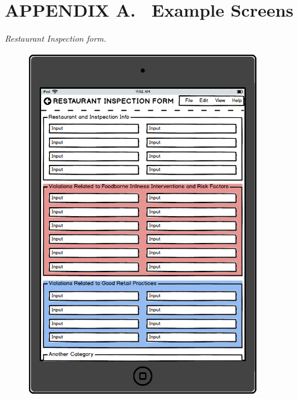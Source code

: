 \documentclass[twoside,letterpaper]{article}
\begin{document}
\clearpage\section[APPENDIX A. \ Example Screens]{\rmfamily\bfseries\color{black}
APPENDIX A. \ Example Screens}
{\itshape\color{black}
Restaurant Inspection form. 
}
\begin{figure}[H]
\centering
\renewcommand{\figurename}{InspectionMockup}
\includegraphics[width=4in,height=6in]{mockup1.png}
\end{figure}
\end{document}
